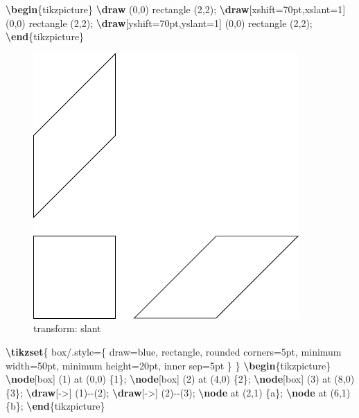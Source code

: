 \documentclass[
]{book}
\newenvironment{Shaded}{\begin{snugshade}}{\end{snugshade}}
\newcommand{\ExtensionTok}[1]{#1}
\newcommand{\FunctionTok}[1]{\textcolor[rgb]{0.13,0.29,0.53}{\textbf{#1}}}
\newcommand{\KeywordTok}[1]{\textcolor[rgb]{0.13,0.29,0.53}{\textbf{#1}}}
\newcommand{\NormalTok}[1]{#1}
\theoremstyle{definition}
\theoremstyle{definition}
\theoremstyle{definition}
\theoremstyle{definition}
\theoremstyle{remark}
\begin{document}
\begin{Shaded}
\begin{Highlighting}[]
\KeywordTok{\textbackslash{}begin}\NormalTok{\{}\ExtensionTok{tikzpicture}\NormalTok{\}}
  \FunctionTok{\textbackslash{}draw}\NormalTok{ (0,0) rectangle (2,2);}
  \FunctionTok{\textbackslash{}draw}\NormalTok{[xshift=70pt,xslant=1] (0,0) rectangle (2,2);}
  \FunctionTok{\textbackslash{}draw}\NormalTok{[yshift=70pt,yslant=1] (0,0) rectangle (2,2);}
\KeywordTok{\textbackslash{}end}\NormalTok{\{}\ExtensionTok{tikzpicture}\NormalTok{\}}
\end{Highlighting}
\end{Shaded}

\begin{figure}
\includegraphics[width=0.75\linewidth]{202401311000-TikZ_files/figure-latex/unnamed-chunk-53-1} \caption{transform: slant}\label{fig:unnamed-chunk-53}
\end{figure}

\begin{Shaded}
\begin{Highlighting}[]
\FunctionTok{\textbackslash{}tikzset}\NormalTok{\{}
\NormalTok{  box/.style=\{}
\NormalTok{    draw=blue,}
\NormalTok{    rectangle,}
\NormalTok{    rounded corners=5pt,}
\NormalTok{    minimum width=50pt,}
\NormalTok{    minimum height=20pt,}
\NormalTok{    inner sep=5pt}
\NormalTok{  \}}
\NormalTok{\}}
\KeywordTok{\textbackslash{}begin}\NormalTok{\{}\ExtensionTok{tikzpicture}\NormalTok{\}}
  \FunctionTok{\textbackslash{}node}\NormalTok{[box] (1) at (0,0) \{1\};}
  \FunctionTok{\textbackslash{}node}\NormalTok{[box] (2) at (4,0) \{2\};}
  \FunctionTok{\textbackslash{}node}\NormalTok{[box] (3) at (8,0) \{3\};}
  \FunctionTok{\textbackslash{}draw}\NormalTok{[{-}\textgreater{}] (1){-}{-}(2);}
  \FunctionTok{\textbackslash{}draw}\NormalTok{[{-}\textgreater{}] (2){-}{-}(3);}
  \FunctionTok{\textbackslash{}node}\NormalTok{ at (2,1) \{a\};}
  \FunctionTok{\textbackslash{}node}\NormalTok{ at (6,1) \{b\};}
\KeywordTok{\textbackslash{}end}\NormalTok{\{}\ExtensionTok{tikzpicture}\NormalTok{\}}
\end{Highlighting}
\end{Shaded}
\end{document}
